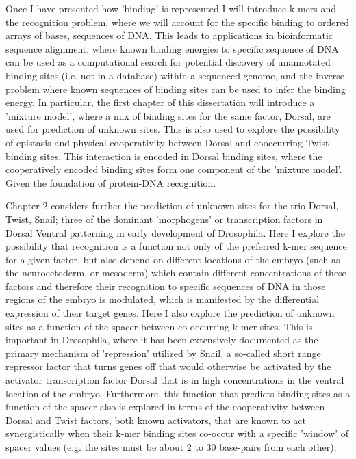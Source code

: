 Once I have presented how 'binding' is represented I will introduce k-mers and the recognition problem, where we will account for the specific binding to ordered arrays of bases, sequences of DNA.  This leads to applications in bioinformatic sequence alignment, where known binding energies to specific sequence of DNA can be used as a computational search for potential discovery of unannotated binding sites (i.e. not in a database) within a sequenced genome, and the inverse problem where known sequences of binding sites can be used to infer the binding energy.  In particular, the first chapter of this dissertation will introduce a 'mixture model', where a mix of binding sites for the same factor, Dorsal, are used for prediction of unknown sites.  This is also used to explore the possibility of epistasis and physical cooperativity between Dorsal and cooccurring Twist binding sites.  This interaction is encoded in Dorsal binding sites, where the cooperatively encoded binding sites form one component of the 'mixture model'.  Given the foundation of protein-DNA recognition.

Chapter 2 considers further the prediction of unknown sites for the trio Dorsal, Twist, Snail; three of the dominant 'morphogens' or transcription factors in Dorsal Ventral patterning in early development of Drosophila.  Here I explore the possibility that recognition is a function not only of the preferred k-mer sequence for a given factor, but also depend on different locations of the embryo (such as the neuroectoderm, or mesoderm) which contain different concentrations of these factors and therefore their recognition to specific sequences of DNA in those regions of the embryo is modulated, which is manifested by the differential expression of their target genes.  Here I also explore the prediction of unknown sites as a function of the spacer between co-occurring k-mer sites.  This is important in Drosophila, where it has been extensively documented as the primary mechanism of 'repression' utilized by Snail, a so-called short range repressor factor that turns genes off that would otherwise be activated by the activator transcription factor Dorsal that is in high concentrations in the ventral location of the embryo.  Furthermore, this function that predicts binding sites as a function of the spacer also is explored in terms of the cooperativity between Dorsal and Twist factors, both known activators, that are known to act synergistically when their k-mer binding sites co-occur with a specific 'window' of spacer values (e.g. the sites must be about 2 to 30 base-pairs from each other).   

